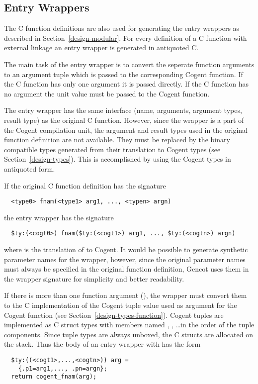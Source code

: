 \subsection{Entry Wrappers}
\label{design-fundefs-wrapper}

The C function definitions are also used for generating the entry wrappers as described in Section~\ref{design-modular}.
For every definition of a C function with external linkage an entry wrapper is generated in antiquoted C.

The main task of the entry wrapper is to convert the seperate function arguments to an argument tuple which is passed
to the corresponding Cogent function. If the C function has only one argument it is passed directly. If the C 
function has no argument the unit value must be passed to the Cogent function.

The entry wrapper has the same interface (name, arguments, argument types, result type) as the original C function.
However, since the wrapper is a part of the Cogent compilation unit, the argument and result types used in the 
original function definition are not available. They must be replaced by the binary compatible types generated 
from their translation to Cogent types (see Section~\ref{design-types}). This is accomplished by using the Cogent
types in antiquoted form.

If the original C function definition has the signature
\begin{verbatim}
  <type0> fnam(<type1> arg1, ..., <typen> argn)
\end{verbatim}
the entry wrapper has the signature
\begin{verbatim}
  $ty:(<cogt0>) fnam($ty:(<cogt1>) arg1, ..., $ty:(<cogtn>) argn)
\end{verbatim}
where  is the translation of  to Cogent. It would be possible to generate synthetic 
parameter names for the wrapper, however, since the original parameter names must always be specified in the 
original function definition, Gencot uses them in the wrapper signature for simplicity and better readability.

If there is more than one function argument (), the wrapper must convert them to the C implementation
of the Cogent tuple value used as argument for the Cogent function (see Section~\ref{design-types-function}).
Cogent tuples are implemented as C struct types with members named , , \ldots in the order
of the tuple components. Since tuple types are always unboxed, the C structs are allocated on the stack. Thus
the body of an entry wrapper with  has the form
\begin{verbatim}
  $ty:((<cogt1>,...,<cogtn>)) arg = 
    {.p1=arg1,..., .pn=argn};
  return cogent_fnam(arg);
\end{verbatim}

